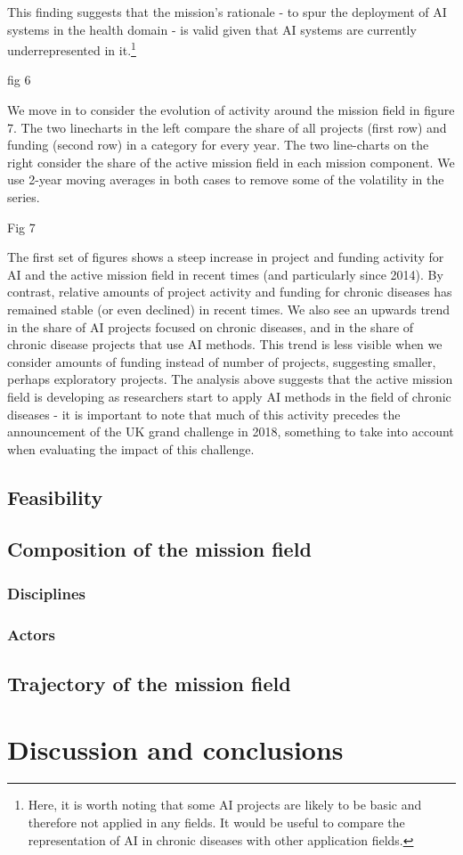\documentclass[11pt]{article}
\begin{document}
This finding suggests that the mission's rationale - to spur the deployment of AI systems in the health domain - is valid given that AI systems are currently underrepresented in it.\footnote{Here, it is worth noting that some AI projects are likely to be basic and therefore not applied in any fields. It would be useful to compare the representation of AI in chronic diseases with other application fields.} 

fig 6

We move in to consider the evolution of activity around the mission field in figure 7. The two linecharts in the left compare the share of all projects (first row) and funding (second row) in a category for every year. The two line-charts on the right consider the share of the active mission field in each mission component. We use 2-year moving averages in both cases to remove some of the volatility in the series.

Fig 7

The first set of figures shows a steep increase in project and funding activity for AI and the active mission field in recent times (and particularly since 2014). By contrast, relative amounts of project activity and funding for chronic diseases has remained stable (or even declined) in recent times. We also see an upwards trend in the share of AI projects focused on chronic diseases, and in the share of chronic disease projects that use AI methods. This trend is less visible when we consider amounts of funding instead of number of projects, suggesting smaller, perhaps exploratory projects. The analysis above suggests that the active mission field is developing as researchers start to apply AI methods in the field of chronic diseases - it is important to note that much of this activity precedes the announcement of the UK grand challenge in 2018, something to take into account when evaluating the impact of this challenge.

\subsection{Feasibility}
\subsection{Composition of the mission field}
\subsubsection{Disciplines}
\subsubsection{Actors}
\subsection{Trajectory of the mission field}
\label{subsec:trajectory}
\section{Discussion and conclusions}




%
\end{document}
